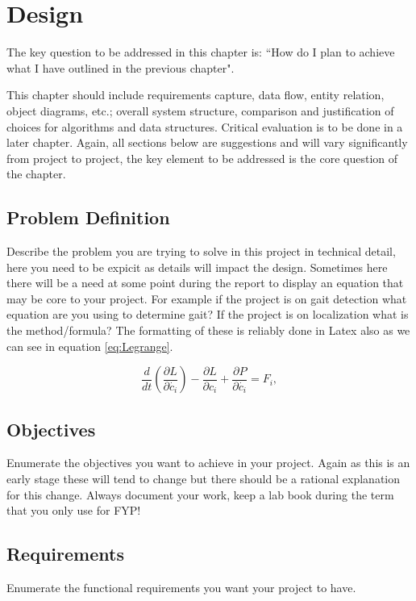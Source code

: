 \chapter{Design}
\label{chap:design}
The key question to be addressed in this chapter is: ``How do I plan to achieve what I have outlined in the previous chapter". 

This chapter should include requirements capture, data flow, entity relation, object diagrams, etc.; overall system structure, comparison and justification of choices for algorithms and data structures. Critical evaluation is to be done in a later chapter. Again, all sections below are suggestions and will vary significantly from project to project, the key element to be addressed is the core question of the chapter.

\section{Problem Definition}
Describe the problem you are trying to solve in this project in technical detail, here you need to be expicit as details will impact the design. Sometimes here there will be a need at some point during the report to display an equation that may be core to your project. For example if the project is on gait detection what equation are you using to determine gait? If the project is on localization what is the method/formula? The formatting of these is reliably done in Latex also as we can see in equation \ref{eq:Legrange}.

\begin{equation}
\frac{d}{dt}(\frac{\partial L}{\partial \dot{c_i}})-\frac{\partial L}{\partial c_i}+\frac{\partial P}{\partial \dot{c_i}} = F_i,
\label{eq:Legrange}
\end{equation}

\section{Objectives}
Enumerate the objectives you want to achieve in your project. Again as this is an early stage these will tend to change but there should be a rational explanation for this change. Always document your work, keep a lab book during the term that you only use for FYP!

\section{Requirements}
Enumerate the functional requirements you want your project to have. 

